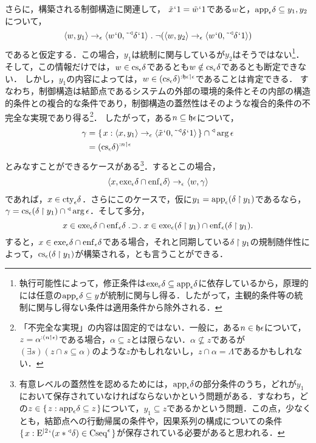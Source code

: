 さらに，構築される制御構造に関連して，
$ \tilde{x}{\mspace{1mu}{`}\mspace{1mu}} 1 = \tilde{w}{\mspace{1mu}{`}\mspace{1mu}} 1 $である$w$と，$ \mathrm{app}_{\epsilon}\delta\subseteq y_1,y_2 $について，
\[
    \orp{w,y_1}\to_{\epsilon}\orp{w\fap 0,\tildel{\trgl{\delta}}\fap 1}\con{1}\neg(\orp{w,y_2}\to_{\epsilon}\orp{w\fap 0,\tildel{\trgl{\delta}}\fap 1})
\]
であると仮定する．この場合，$y_1$は統制に関与しているが$y_2$はそうではない\footnote{
    執行可能性によって，修正条件は$ \mathrm{exe}_{\epsilon}\delta\subseteq\mathrm{app}_{\epsilon}\delta $に依存しているから，原理的には任意の$ \mathrm{app}_{\epsilon}\delta\subseteq y $が統制に関与し得る．したがって，主観的条件等の統制に関与し得ない条件は適用条件から除外される．}．
そして，この情報だけでは，$ w\in\mathrm{cs}_{\epsilon}\delta $であるとも$ w\notin\mathrm{cs}_{\epsilon}\delta $であるとも断定できない．
しかし，$ y_1 $の内容によっては，$ w\in (\mathrm{cs}_{\epsilon}\delta)^{:\mathfrak{h}\epsilon\mathbin{\upharpoonleft}\epsilon} $であることは肯定できる．
すなわち，制御構造は結節点であるシステムの外部の環境的条件とその内部の構造的条件との複合的な条件であり，制御構造の蓋然性はそのような複合的条件の不完全な実現であり得る\footnote{
    「不完全な実現」の内容は固定的ではない．一般に，ある$n\in\mathfrak{h}\epsilon$について，$ z = \alpha^{:(n\mathbin{\upharpoonleft}\epsilon)} $である場合，$\alpha\subseteq z$とは限らない．$\alpha\nsubseteq z$であるが$(\exists s)(z\cap s\subseteq\alpha)$のような$z$かもしれないし，$ z\cap\alpha = \Lambda $であるかもしれない．
}．
したがって，ある$n\subseteq\mathfrak{h}\epsilon$について，
\begin{align*}
    \gamma & = \{\mspace{2mu}x:\langle x,y_1 \rangle\to_{\epsilon}\langle \tilde{x}{\mspace{1mu}{`}\mspace{1mu}} 0,\tilde{\:\:}{^\triangleleft}\delta{\mspace{1mu}{`}\mspace{1mu}} 1 \rangle\mspace{2mu}\}\cap{^\triangleleft}\arg\epsilon\\ & = (\mathrm{cs}_{\epsilon}\delta)^{:n\mathbin{\upharpoonleft}\epsilon}
\end{align*}
とみなすことができるケースがある\footnote{
    有意レベルの蓋然性を認めるためには，$ \mathrm{app}_{\epsilon}\delta $の部分条件のうち，どれが$y_1$において保存されていなければならないかという問題がある．すなわち，どの$ z\in\{\mspace{2mu}z:\mathrm{app}_{\epsilon}\delta\subseteq z\mspace{2mu}\} $について，$ y_1\subseteq z $であるかという問題．この点，少なくとも，結節点への行動帰属の条件や，因果系列の構成についての条件$ \{\mspace{2mu}x:\mathrm{E}^{\mid 2}{\mspace{1mu}{`}\mspace{1mu}}(x*{^\triangleleft}\delta)\in\mathrm{Cseq}^\epsilon\mspace{2mu}\} $が保存されている必要があると思われる．
}．するとこの場合，
\begin{align*}
    \langle x,\mathrm{exe}_{\epsilon}\delta\cap\mathrm{enf}_{\epsilon}\delta \rangle\to_{\epsilon}\langle w,\gamma \rangle
\end{align*}
であれば，$ x\in\mathrm{cty}_{\epsilon}\delta $．さらにこのケースで，仮に$ y_1 = \mathrm{app}_{\epsilon}{(\delta\mathbin{\upharpoonright} y_1)} $であるなら，$ \gamma = \mathrm{cs}_{\epsilon}(\delta\mathbin{\upharpoonright} y_1)\cap {^\triangleleft}\arg\epsilon $．そして多分，
\[
    x\in \exe{\epsilon}\delta\cap\enf{\epsilon}\delta\case{1}{1}{1}x\in \exe{\epsilon}(\delta\uphr y_1)\cap\enf{\epsilon}(\delta\uphr y_1).
\]
すると，$ x\in \mathrm{exe}_{\epsilon}\delta\cap\mathrm{enf}_{\epsilon}\delta $である場合，それと同期している$ \delta\mathbin{\upharpoonright} y_1 $の規制随伴性によって，$ \mathrm{cs}_{\epsilon}(\delta\mathbin{\upharpoonright} y_1) $が構築される，とも言うことができる．

